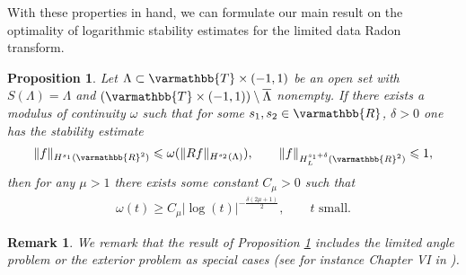 \documentclass[12pt,twoside]{amsart}
\numberwithin{equation}{section}
\renewcommand{\leq}{\leqslant}
\renewcommand{\geq}{\geqslant}
\renewcommand{\mathbb}{\varmathbb}
\newtheorem{proposition}[theorem]{Proposition}
\newtheorem{remark}[theorem]{Remark}
\newcommand {\R} {\mathbb{R}} \newcommand {\Z} {\mathbb{Z}}
\newcommand {\T} {\mathbb{T}} \newcommand {\N} {\mathbb{N}}
\newcommand{\mR}{\mathbb{R}}                    %
\newcommand{\norm}[1]{\lVert #1 \rVert}         %
\newcommand{\ol}[1]{\overline{#1}}
\begin{document}
With these properties in hand, we can formulate our main result on the optimality of logarithmic stability estimates for the limited data Radon transform.

\begin{proposition}
\label{prop:LDRT}
Let $\Lambda \subset \T \times (-1,1)$ be an open set with $S(\Lambda) = \Lambda$ and $(\T \times (-1,1)) \setminus \ol{\Lambda}$ nonempty. If there exists a modulus of continuity $\omega$ such that for some $s_1, s_2 \in \R$, $\delta>0$ one has the stability estimate 
\begin{align*}
\|f\|_{H^{s_1}(\R^2)} \leq  \omega(\|Rf\|_{H^{s_2}(\Lambda)}), \qquad \norm{f}_{H^{s_1+\delta}_L(\mR^2)} \leq 1,
\end{align*}
then for any $\mu>1$ there exists some constant $C_{\mu}>0$ such that 
\begin{align*}
\omega(t)\geq C_{\mu} |\log(t)|^{-\frac{\delta(2\mu+1)}{2}}, \qquad \text{$t$ small}.
\end{align*}
\end{proposition}

\begin{remark}
\label{rmk:Gevrey}
We remark that the result of Proposition \ref{prop:LDRT} includes the limited angle problem or the exterior problem as special cases (see for instance Chapter VI in \cite{Natterer_book}).
\end{remark}
\end{document}
